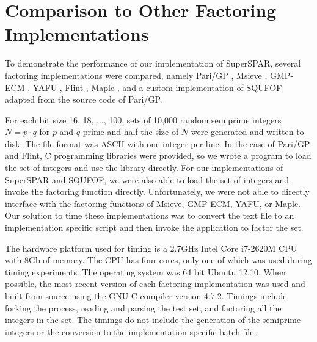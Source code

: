 \documentclass{ucalgthes1}
\theoremstyle{definition}
\newcommand{\compiler}{GNU C compiler version 4.7.2}
\newcommand{\cpu}{2.7GHz Intel Core i7-2620M CPU}
\begin{document}
\clearpage

\section{Comparison to Other Factoring Implementations}
\label{sec:ssparComparison}

To demonstrate the performance of our implementation of SuperSPAR, several factoring implementations were compared, namely Pari/GP \cite{PariGP}, Msieve \cite{Msieve}, GMP-ECM \cite{Ecm}, YAFU \cite{Yafu}, Flint \cite{Flint}, Maple \cite{Maple}, and a custom implementation of SQUFOF \cite{Gower2008} adapted from the source code of Pari/GP.

For each bit size 16, 18, ..., 100, sets of 10,000 random semiprime integers $N = p \cdot q$ for $p$ and $q$ prime and half the size of $N$ were generated and written to disk.  The file format was ASCII with one integer per line.  In the case of Pari/GP and Flint, C programming libraries were provided, so we wrote a program to load the set of integers and use the library directly.  For our implementations of SuperSPAR and SQUFOF, we were also able to load the set of integers and invoke the factoring function directly.   Unfortunately, we were not able to directly interface with the factoring functions of Msieve, GMP-ECM, YAFU, or Maple.  Our solution to time these implementations was to convert the text file to an implementation specific script and then invoke the application to factor the set.

The hardware platform used for timing is a \cpu{} with 8Gb of memory.  The CPU has four cores, only one of which was used during timing experiments.  The operating system was 64 bit Ubuntu 12.10.  When possible, the most recent version of each factoring implementation was used and built from source using the \compiler{}.  Timings include forking the process, reading and parsing the test set, and factoring all the integers in the set.  The timings do not include the generation of the semiprime integers or the conversion to the implementation specific batch file.
\end{document}
